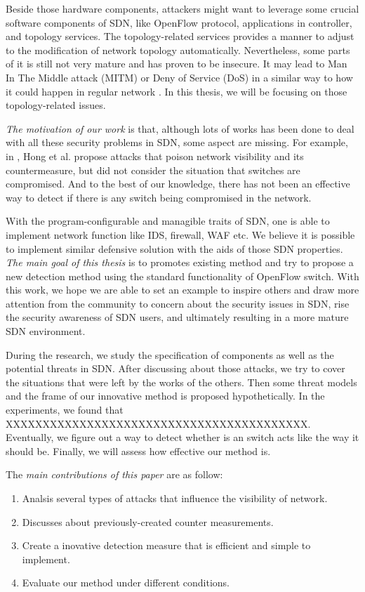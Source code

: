 Beside those hardware components, attackers might want to leverage some crucial software components of SDN, like OpenFlow protocol, applications in controller, and topology services. The topology-related services  provides a manner to adjust to the modification of network topology automatically. Nevertheless, some parts of it is still not very mature and has proven to be insecure. It may lead to Man In The Middle attack (MITM) or Deny of Service (DoS) in a similar way to how it could happen in regular network \cite{ASO}. In this thesis, we will be focusing on those topology-related issues.

\emph{The motivation of our work} is that, although lots of works has been done to deal with all these security problems in SDN, some aspect are missing. For example, in \cite{HXWG_15}, Hong et al. propose attacks that poison network visibility and its countermeasure, but did not consider the situation that switches are compromised. And to the best of our knowledge, there has not been an effective way to detect if there is any switch being compromised in the network. 

With the program-configurable and managible traits of SDN, one is able to implement network function like IDS, firewall, WAF etc. We believe it is possible to implement similar defensive solution with the aids of those SDN properties. \emph{The main goal of this thesis} is to promotes existing method and try to propose a new detection method using the standard functionality of OpenFlow switch. With this work, we hope we are able to set an example to inspire others and draw more attention from the community to concern about the security issues in SDN, rise the security awareness of SDN users, and ultimately resulting in a more mature SDN environment.

During the research, we study the specification of components as well as the potential threats in SDN. After discussing about those attacks, we try to cover the situations that were left by the works of the others. Then some threat models and the frame of our innovative method is proposed hypothetically. 
In the experiments, we found that XXXXXXXXXXXXXXXXXXXXXXXXXXXXXXXXXXXXXXXXX. Eventually, we figure out a way to detect whether is an switch acts like the way it should be. Finally, we will assess how effective our method is.

The \emph{main contributions of this paper} are as follow:

\begin{enumerate}
\item
Analsis several types of attacks that influence the visibility of network.
\item
Discusses about previously-created counter measurements.
\item
Create a inovative detection measure that is efficient and simple to implement.
\item
Evaluate our method under different conditions.
\end{enumerate}


